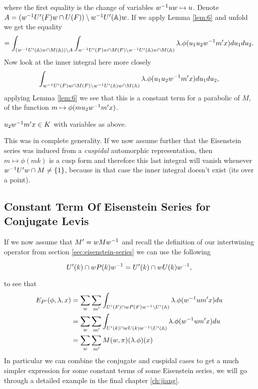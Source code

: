    where the first equality is the change of variables \(w^{-1} u w\mapsto u \). Denote \(A = (w\inv U'(F) w \cap U(F) ) \setminus w\inv U'(\A)w \). If we apply Lemma \ref{lem:6} and unfold we get the equality
    \[= \int_{(w\inv U'(\A)w \cap M(\A)) \setminus A} \int_{w\inv U'(F) w \cap M(F) \setminus w\inv U'(\A)w \cap M(\A)} \lambda.\phi( u_1 u_2 w\inv m' x)  du_1 du_2.\]
     Now look at the inner integral here more closely 
    \[ \int_{w\inv U'(F) w \cap M(F) \setminus w\inv U'(\A)w \cap M(\A)}\lambda. \phi( u_1 u_2 w\inv m' x)  du_1 du_2,\]
    applying Lemma \ref{lem:6} we see that this is a constant term for a parabolic of \(M\), of the function \(m\mapsto \phi(m u_2 w\inv m' x)\). 
    \begin{Lemma}
        \(u_2 w^{-1} m' x \in K\) with variables as above.
    \end{Lemma}
    This was in complete generality. If we now assume further that the Eisenstein series was induced from a \textit{cuspidal} automorphic representation, then \(m\mapsto \phi(mk)\) is a cusp form and therefore this last integral will vanish whenever \(w^{-1} U'w \cap M \neq \{1\}\), because in that case the inner integral doesn't exist (its over a point).

    \subsection{Constant Term Of Eisenstein Series for Conjugate Levis}\label{constant_conjugate_levi}
    If we now assume that \(M' = wMw^{-1}\) and recall the definition of our intertwining operator from section \ref{sec:eisenstein-series} we can use the following 
    \begin{Lemma}
        \[U'(k) \cap wP(k) w^{-1} = U'(k) \cap wU(k)w^{-1},\]
    \end{Lemma}
    to see that 
    \begin{equation*}
        \begin{aligned}
             E_{P'}( \phi, \lambda, x) &= \sum_{ w} \sum_{m'} \int_{U'(F)\cap wP(F)w\inv \setminus U'(\A)} \lambda.\phi( w\inv um' x)  du \\
             &=  \sum_{ w} \sum_{m'} \int_{U'(k) \cap wU(k)w\inv \setminus U'(\A)} \lambda.\phi( w\inv um' x)  du \\
             &= \sum_{ w} \sum_{m'} M(w, \pi)(\lambda.\phi)(x)
        \end{aligned}
    \end{equation*}
    In particular we can combine the conjugate and cuspidal cases to get a much simpler expression for some constant terms of some Eisenstein series, we will go through a detailed example in the final chapter \ref{ch:jiang}.
    


    